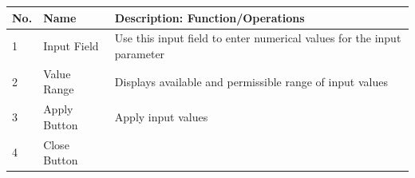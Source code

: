 \begin{longtable}[]{@{}lll@{}}
\toprule
\begin{minipage}[b]{0.07\columnwidth}\raggedright
No.\strut
\end{minipage} & \begin{minipage}[b]{0.26\columnwidth}\raggedright
Name\strut
\end{minipage} & \begin{minipage}[b]{0.59\columnwidth}\raggedright
Description: Function/Operations\strut
\end{minipage}\tabularnewline
\midrule
\endhead
\begin{minipage}[t]{0.07\columnwidth}\raggedright
1\strut
\end{minipage} & \begin{minipage}[t]{0.26\columnwidth}\raggedright
Input Field\strut
\end{minipage} & \begin{minipage}[t]{0.59\columnwidth}\raggedright
Use this input field to enter numerical values for the input
parameter\strut
\end{minipage}\tabularnewline
\begin{minipage}[t]{0.07\columnwidth}\raggedright
2\strut
\end{minipage} & \begin{minipage}[t]{0.26\columnwidth}\raggedright
Value Range\strut
\end{minipage} & \begin{minipage}[t]{0.59\columnwidth}\raggedright
Displays available and permissible range of input values\strut
\end{minipage}\tabularnewline
\begin{minipage}[t]{0.07\columnwidth}\raggedright
3\strut
\end{minipage} & \begin{minipage}[t]{0.26\columnwidth}\raggedright
Apply Button\strut
\end{minipage} & \begin{minipage}[t]{0.59\columnwidth}\raggedright
Apply input values\strut
\end{minipage}\tabularnewline
\begin{minipage}[t]{0.07\columnwidth}\raggedright
4\strut
\end{minipage} & \begin{minipage}[t]{0.26\columnwidth}\raggedright
Close Button\strut
\end{minipage} & \begin{minipage}[t]{0.59\columnwidth}\raggedright

\end{minipage}
\end{longtable}

